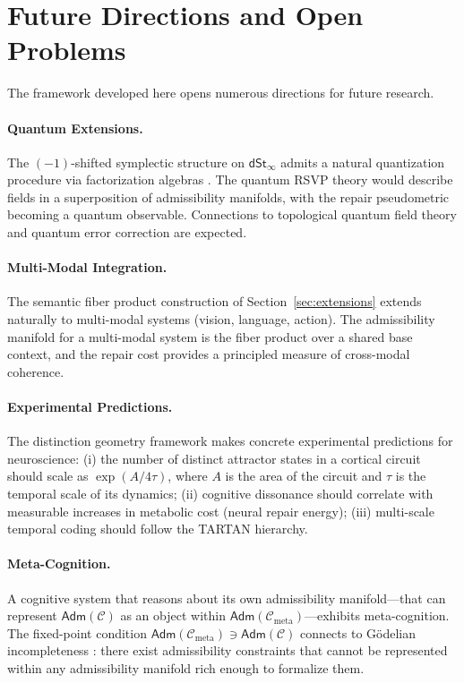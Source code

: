 \documentclass[a4paper,12pt]{article}
\theoremstyle{definition}
\newcommand{\dSt}{\mathsf{dSt}_\infty}
\newcommand{\Adm}{\mathsf{Adm}}
\begin{document}
\section{Future Directions and Open Problems}
\label{sec:future}

The framework developed here opens numerous directions for future research.

\paragraph{Quantum Extensions.} The $(-1)$-shifted symplectic structure on $\dSt$ admits a natural quantization procedure via factorization algebras \cite{Costello2017}. The quantum RSVP theory would describe fields in a superposition of admissibility manifolds, with the repair pseudometric becoming a quantum observable. Connections to topological quantum field theory and quantum error correction are expected.

\paragraph{Multi-Modal Integration.} The semantic fiber product construction of Section~\ref{sec:extensions} extends naturally to multi-modal systems (vision, language, action). The admissibility manifold for a multi-modal system is the fiber product over a shared base context, and the repair cost provides a principled measure of cross-modal coherence.

\paragraph{Experimental Predictions.} The distinction geometry framework makes concrete experimental predictions for neuroscience: (i) the number of distinct attractor states in a cortical circuit should scale as $\exp(A/4\tau)$, where $A$ is the area of the circuit and $\tau$ is the temporal scale of its dynamics; (ii) cognitive dissonance should correlate with measurable increases in metabolic cost (neural repair energy); (iii) multi-scale temporal coding should follow the TARTAN hierarchy.

\paragraph{Meta-Cognition.} A cognitive system that reasons about its own admissibility manifold—that can represent $\Adm(\mathcal{C})$ as an object within $\Adm(\mathcal{C}_{\text{meta}})$—exhibits meta-cognition. The fixed-point condition $\Adm(\mathcal{C}_{\text{meta}}) \ni \Adm(\mathcal{C})$ connects to Gödelian incompleteness \cite{Godel1931}: there exist admissibility constraints that cannot be represented within any admissibility manifold rich enough to formalize them.
\end{document}

